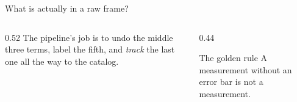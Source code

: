 \documentclass[10pt,aspectratio=169]{beamer}
\begin{document}
\begin{frame}{What is actually in a raw frame?}
  \vspace{1.2em}
  \begin{columns}[T]
    \begin{column}{0.52\textwidth}
      \footnotesize The pipeline's job is to undo the middle three terms, label the
      fifth, and \emph{track} the last one all the way to the catalog.
    \end{column}
    \begin{column}{0.44\textwidth}
      \begin{block}{\small The golden rule}
        \small A measurement without an error bar is not a measurement.
      \end{block}
    \end{column}
  \end{columns}
\end{frame}
\end{document}
